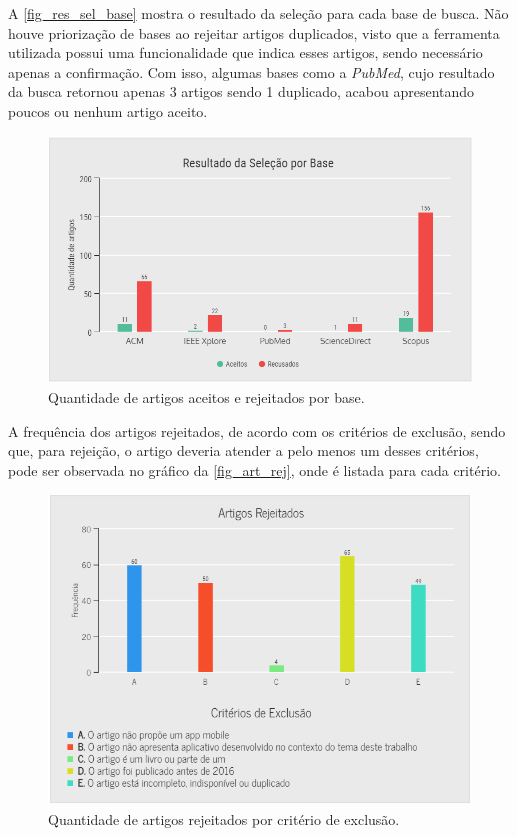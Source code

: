 A \autoref{fig_res_sel_base} mostra o resultado da seleção para cada base de busca.
Não houve priorização de bases ao rejeitar artigos duplicados, visto que a ferramenta utilizada possui uma funcionalidade que indica esses artigos, sendo necessário apenas a confirmação.
Com isso, algumas bases como a \emph{PubMed}, cujo resultado da busca retornou apenas 3 artigos sendo 1 duplicado, acabou apresentando poucos ou nenhum artigo aceito.

\begin{figure}[htb]
	\caption{\label{fig_res_sel_base}Quantidade de artigos aceitos e rejeitados por base.}
	\begin{center}
	    \includegraphics[scale=0.6]{Imagens/msl/resultado_selecao_base.png}
	\end{center}
\end{figure}

\newpage

A frequência dos artigos rejeitados, de acordo com os critérios de exclusão, sendo que, para rejeição, o artigo deveria atender a pelo menos um desses critérios, pode ser observada no gráfico da \autoref{fig_art_rej}, onde é listada para cada critério.

\begin{figure}[htb]
	\caption{\label{fig_art_rej}Quantidade de artigos rejeitados por critério de exclusão.}
	\begin{center}
	    \includegraphics[scale=0.6]{Imagens/msl/artigos_rejeitados.png}
	\end{center}
\end{figure}


